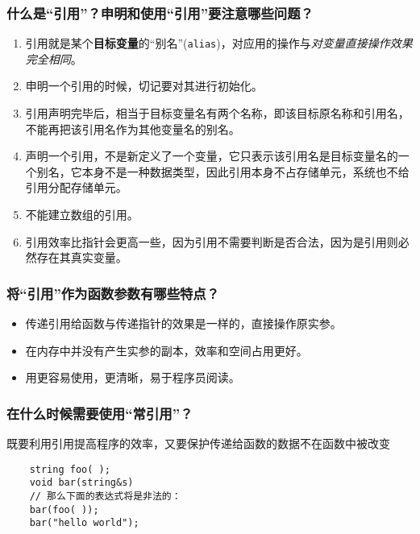 \documentclass[UTF8,a4paper,8pt]{ctexart}
\begin{document}
		\subsubsection{什么是“引用”？申明和使用“引用”要注意哪些问题？}
			\begin{enumerate}[itemindent = 1em]
				\item 引用就是某个\textbf{目标变量}的“别名”(\verb|alias|)，对应用的操作与\textit{对变量直接操作效果完全相同}。
				
				\item 申明一个引用的时候，切记要对其进行初始化。
				
				\item 引用声明完毕后，相当于目标变量名有两个名称，即该目标原名称和引用名，不能再把该引用名作为其他变量名的别名。
				
				\item 声明一个引用，不是新定义了一个变量，它只表示该引用名是目标变量名的一个别名，它本身不是一种数据类型，因此引用本身不占存储单元，系统也不给引用分配存储单元。
				
				\item 不能建立数组的引用。
				
				\item 引用效率比指针会更高一些，因为引用不需要判断是否合法，因为是引用则必然存在其真实变量。
			\end{enumerate}
		\subsubsection{将“引用”作为函数参数有哪些特点？}
			\begin{itemize}[itemindent = 1em]
				\item 传递引用给函数与传递指针的效果是一样的，直接操作原实参。
				\item 在内存中并没有产生实参的副本，效率和空间占用更好。
				\item 用更容易使用，更清晰，易于程序员阅读。
			\end{itemize}
		\subsubsection{在什么时候需要使用“常引用”？}
			既要利用引用提高程序的效率，又要保护传递给函数的数据不在函数中被改变
			
			\begin{lstlisting}
	string foo( );
	void bar(string&s)
	// 那么下面的表达式将是非法的：
	bar(foo( ));
	bar("hello world");
			\end{lstlisting}
			
\end{document}
